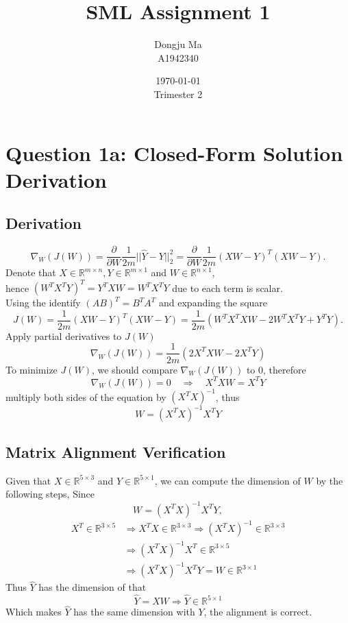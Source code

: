 \documentclass{article}
\title{SML Assignment 1}
\author{Dongju Ma \\ A1942340}
\date{\today \\ Trimester 2}
\begin{document}
\maketitle

\section*{Question 1a: Closed-Form Solution Derivation}
\subsection*{Derivation}
$$
\nabla_W(J( {W})) 
=\frac{\partial}{\partial W}\frac{1}{2m}||\hat{ {Y}} -  {Y}||_2^2 
=\frac{\partial}{\partial W}\frac{1}{2m}(XW - Y )^T (XW - Y). 
$$
Denote that $X \in \mathbb{R}^ {m \times n}, Y \in \mathbb{R}^ {m \times 1}$ and $W\in \mathbb{R}^ {n \times 1}$, \\
hence ${(W^TX^TY)}^T = Y^TXW =W^TX^TY$ due to each term is scalar. \\  
Using the identify $(AB)^T = B^T A^T$ and expanding the square
$$
    J(W) = \frac{1}{2m}(XW - Y )^T (XW - Y) = \frac{1}{2m} \left( W^T X^T X W - 2 W^T X^T Y + Y^TY \right).
$$
Apply partial derivatives to $J(W)$
$$
    \nabla_W(J( {W})) = \frac{1}{2m} (2X^TX W - 2 X^T Y)
$$
To minimize $ J( {W}) $,  we should compare $\nabla_W(J( {W}))$ to 0, therefore
$$
\nabla_W(J( {W})) = 0 \quad \Rightarrow \quad X^TX W = X^T Y
$$
multiply both sides of the equation by $(X^TX)^{-1}$, thus
$$
W = (X^TX)^{-1} X^T Y
$$

\subsection*{Matrix Alignment Verification}
Given that $X \in \mathbb{R}^{5 \times 3}$ and $Y \in \mathbb{R}^{5 \times 1}$,  
we can compute the dimension of $W$ by the following steps, Since
$$
W = (X^TX)^{-1} X^T Y,
$$
\begin{align*}
X^T \in \mathbb{R}^{3 \times 5} &\Rightarrow X^TX \in \mathbb{R}^{3 \times 3}
\Rightarrow (X^TX)^{-1} \in \mathbb{R}^{3 \times 3} \\
&\Rightarrow (X^TX)^{-1} X^T \in \mathbb{R}^{3 \times 5} \\ 
&\Rightarrow (X^TX)^{-1} X^T Y = W \in \mathbb{R}^{3 \times 1}
\end{align*}
Thus $\hat{Y} $ has the dimension of that
$$
\hat{Y} = XW \Rightarrow \hat{Y} \in \mathbb{R}^{5 \times 1}
$$
Which makes $\hat{Y}$ has the same dimension with $Y$, the alignment is correct.
\end{document}
